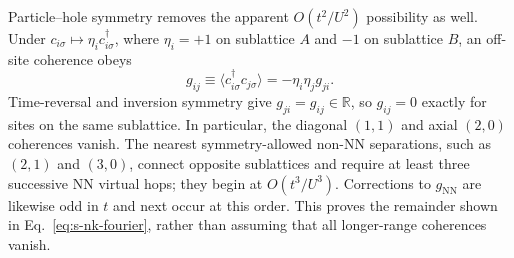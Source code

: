 \documentclass[10pt]{article}
\begin{document}
Particle--hole symmetry removes the apparent $O(t^2/U^2)$ possibility as
well.  Under
$c_{i\sigma}\mapsto\eta_i c^\dagger_{i\sigma}$, where
$\eta_i=+1$ on sublattice $A$ and $-1$ on sublattice $B$, an off-site
coherence obeys
\[
 g_{ij}\equiv\langle c^\dagger_{i\sigma}c_{j\sigma}\rangle
 =-\eta_i\eta_j g_{ji}.
\]
Time-reversal and inversion symmetry give $g_{ji}=g_{ij}\in\mathbb R$, so
$g_{ij}=0$ exactly for sites on the same sublattice.  In particular, the
diagonal $(1,1)$ and axial $(2,0)$ coherences vanish.  The nearest
symmetry-allowed non-NN separations, such as $(2,1)$ and $(3,0)$, connect
opposite sublattices and require at least three successive NN virtual hops;
they begin at $O(t^3/U^3)$.  Corrections to $g_{\mathrm{NN}}$ are likewise
odd in $t$ and next occur at this order.  This proves the remainder shown in
Eq.~\ref{eq:s-nk-fourier}, rather than assuming that all longer-range
coherences vanish.
\end{document}

